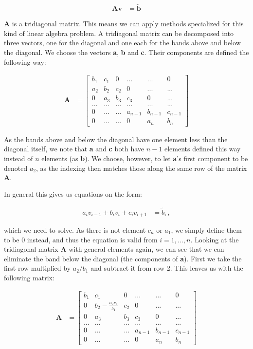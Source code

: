 \documentclass[english,notitlepage,reprint,nofootinbib]{revtex4-1}  %
\begin{document}
\begin{align*}
\textbf{A}\textbf{v} &= \tilde{\textbf{b}}
\end{align*}

\textbf{A} is a tridiagonal matrix. This means we can apply methods specialized for this kind of linear algebra problem. A tridiagonal matrix can be decomposed into three vectors, one for the diagonal and one each for the bands above and below the diagonal. We choose the vectors \textbf{a}, \textbf{b} and \textbf{c}. Their components are defined the following way:

\begin{align*}
\textbf{A} &= \begin{bmatrix}
b_1 & c_1 & 0 & ... & ... & 0 \\
a_2 & b_2 & c_2 & 0 & ... & ... \\
0 & a_3 & b_3 & c_3 & 0 & ... \\
... & ... & ... & ... & ... & ... \\
0 & ... & ... & a_{n-1} & b_{n-1} & c_{n-1} \\
0 & ... & ... & 0 & a_{n} & b_n
\end{bmatrix}
\end{align*}

As the bands above and below the diagonal have one element less than the diagonal itself, we note that \textbf{a} and \textbf{c} both have $n-1$ elements defined this way instead of $n$ elements (as \textbf{b}). We choose, however, to let \textbf{a}'s first component to be denoted $a_2$, as the indexing then matches those along the same row of the matrix \textbf{A}.

In general this gives us equations on the form:

\begin{align*}
a_i v_{i-1} + b_i v_i + c_i v_{i+1} &= \tilde{b}_i \, ,
\end{align*}

which we need to solve. As there is not element $c_n$ or $a_1$, we simply define them to be 0 instead, and thus the equation is valid from $i = 1,...,n$. Looking at the tridiagonal matrix \textbf{A} with general elements again, we can see that we can eliminate the band below the diagonal (the components of \textbf{a}). First we take the first row multiplied by $a_2/b_1$ and subtract it from row 2. This leaves us with the following matrix:

\begin{align*}
\textbf{A} &= \begin{bmatrix}
b_1 & c_1 & 0 & ... & ... & 0 \\
0 & b_2 - \frac{a_2c_1}{b_1} & c_2 & 0 & ... & ... \\
0 & a_3 & b_3 & c_3 & 0 & ... \\
... & ... & ... & ... & ... & ... \\
0 & ... & ... & a_{n-1} & b_{n-1} & c_{n-1} \\
0 & ... & ... & 0 & a_{n} & b_n
\end{bmatrix}
\end{align*}
\end{document}
